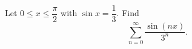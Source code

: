 Let $0\le x\le\dfrac{\pi}{2}$ with $\sin x=\dfrac13$. Find
\[\sum_{n=0}^{\infty}\dfrac{\sin(nx)}{3^n}.\]
